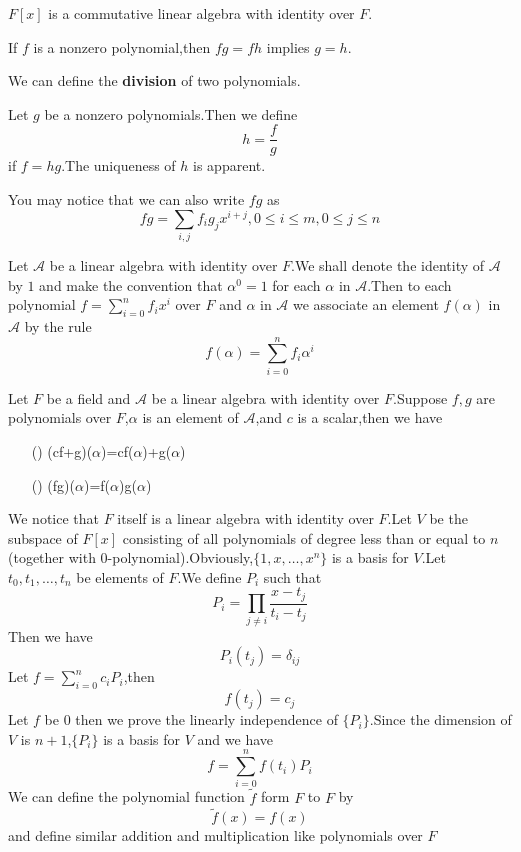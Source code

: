 \documentclass{article}
\newcommand{\rmnum}[1]{\romannumeral #1}
\begin{document}
\begin{coro}
	$F[x]$ is a commutative linear algebra with identity over $F$.
\end{coro}
\begin{coro}
	If $f$ is a nonzero polynomial,then $fg=fh$ implies $g=h$.
\end{coro}
We can define the \textbf{division} of two polynomials.
\begin{dde}
	Let $g$ be a nonzero polynomials.Then we define
	\[h=\frac{f}{g}\]
	if $f=hg$.The uniqueness of $h$ is apparent.
\end{dde}
You may notice that we can also write $fg$ as 
\[fg=\sum\limits_{i,j}f_ig_jx^{i+j},0\le i\le m,0\le j\le n\]
\begin{dde}
	Let $\mathcal{A}$ be a linear algebra with identity over $F$.We shall denote the identity of $\mathcal{A}$ by $1$ and make the convention that $\alpha^0=1$ for each $\alpha$ in $\mathcal{A}$.Then to each polynomial $f=\sum\limits_{i=0}^nf_ix^i$ over $F$ and $\alpha$ in $\mathcal{A}$ we associate an element $f(\alpha)$ in $\mathcal{A}$ by the rule
	\[f(\alpha)=\sum\limits_{i=0}^nf_i\alpha^i\]
\end{dde}
\begin{thm}
	Let $F$ be a field and $\mathcal{A}$ be a linear algebra with identity over $F$.Suppose $f,g$ are polynomials over $F$,$\alpha$ is an element of $\mathcal{A}$,and $c$ is a scalar,then we have
	\begin{enumerate}
		\item [(\rmnum{1})](cf+g)($\alpha$)=cf($\alpha$)+g($\alpha$)
		\item [(\rmnum{2})](fg)($\alpha$)=f($\alpha$)g($\alpha$)
	\end{enumerate}
\end{thm}
We notice that $F$ itself is a linear algebra with identity over $F$.Let $V$ be the subspace of $F[x]$ consisting of all polynomials of degree less than or equal to $n$ (together with $0$-polynomial).Obviously,$\{1,x,\dots,x^n\}$ is a basis for $V$.Let $t_0,t_1,\dots,t_n$ be elements of $F$.We define $P_i$ such that
\[P_i=\prod_{j\neq i}\frac{x-t_j}{t_i-t_j}\]
Then we have
\[P_i(t_j)=\delta_{ij}\]
Let $f=\sum\limits_{i=0}^nc_iP_i$,then
\[f(t_j)=c_j\]
Let $f$ be $0$ then we prove the linearly independence of $\{P_i\}$.Since the dimension of $V$ is $n+1$,$\{P_i\}$ is a basis for $V$ and we have
\[f=\sum\limits_{i=0}^nf(t_i)P_i\]
We can define the polynomial function $\tilde{f}$ form $F$ to $F$ by
\[\tilde{f}(x)=f(x)\]
and define similar addition and multiplication like polynomials over $F$
\end{document}
